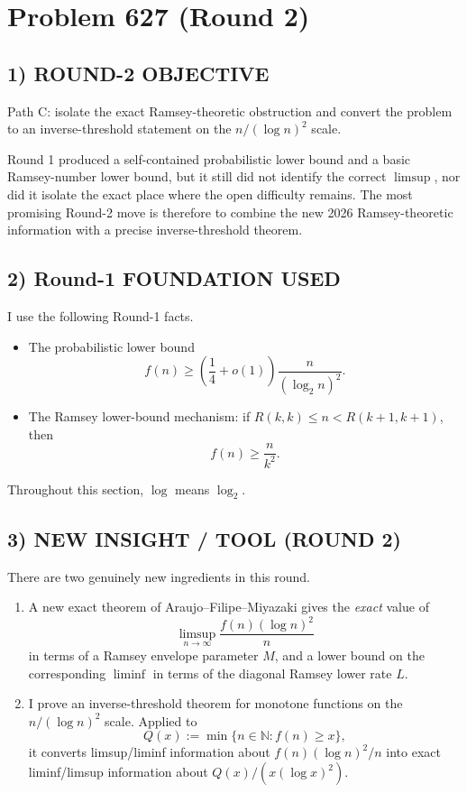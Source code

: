 \section{Problem 627 (Round 2)}

\subsection*{1) ROUND-2 OBJECTIVE}

Path C: isolate the exact Ramsey-theoretic obstruction and convert the problem to an inverse-threshold statement on the \(n/(\log n)^2\) scale.

Round 1 produced a self-contained probabilistic lower bound and a basic Ramsey-number lower bound, but it still did not identify the correct \(\limsup\), nor did it isolate the exact place where the open difficulty remains. The most promising Round-2 move is therefore to combine the new 2026 Ramsey-theoretic information with a precise inverse-threshold theorem.

\subsection*{2) Round-1 FOUNDATION USED}

I use the following Round-1 facts.

\begin{itemize}
\item The probabilistic lower bound
\[
f(n)\ge \left(\frac14+o(1)\right)\frac{n}{(\log_2 n)^2}.
\]
\item The Ramsey lower-bound mechanism: if \(R(k,k)\le n < R(k+1,k+1)\), then
\[
f(n)\ge \frac{n}{k^2}.
\]
\end{itemize}

Throughout this section, \(\log\) means \(\log_2\).

\subsection*{3) NEW INSIGHT / TOOL (ROUND 2)}

There are two genuinely new ingredients in this round.

\begin{enumerate}
\item A new exact theorem of Araujo--Filipe--Miyazaki gives the \emph{exact} value of
\[
\limsup_{n\to\infty}\frac{f(n)(\log n)^2}{n}
\]
in terms of a Ramsey envelope parameter \(M\), and a lower bound on the corresponding \(\liminf\) in terms of the diagonal Ramsey lower rate \(L\).

\item I prove an inverse-threshold theorem for monotone functions on the \(n/(\log n)^2\) scale.
Applied to
\[
Q(x):=\min\{n\in\mathbb N:f(n)\ge x\},
\]
it converts limsup/liminf information about \(f(n)(\log n)^2/n\) into exact liminf/limsup information about \(Q(x)/(x(\log x)^2)\).
\end{enumerate}

